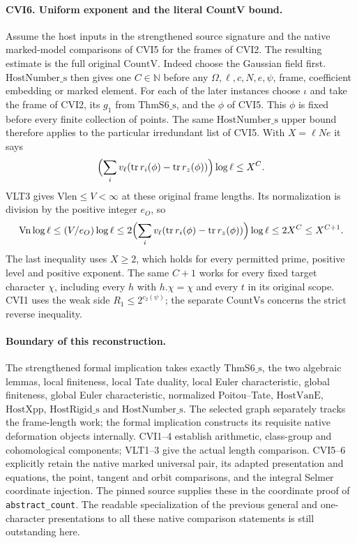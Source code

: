 \paragraph{CVI6. Uniform exponent and the literal CountV bound.}
\label{claim:CVI6}
Assume the host inputs in the strengthened source signature and the
native marked-model comparisons of CVI5 for the frames of CVI2.
The resulting estimate is the full original $\mathrm{CountV}$.
Indeed choose the Gaussian field first. $\mathrm{HostNumber\_s}$
then gives one $C\in\mathbb N$ before any $\Omega,\ell,c,N,e,\psi$,
frame, coefficient embedding or marked element. For each of the
later instances choose $\iota$ and take the frame of CVI2, its
$g_1$ from $\mathrm{ThmS6\_s}$, and the $\phi$ of CVI5. This $\phi$
is fixed before every finite collection of points. The same
$\mathrm{HostNumber\_s}$ upper bound therefore applies to the
particular irredundant list of CVI5. With $X=\ell N e$ it says
\[
 \Bigl(\sum_i v_\ell(\operatorname{tr}r_i(\phi)-
                  \operatorname{tr}r_z(\phi))\Bigr)\log\ell\le X^C .
\]
VLT3 gives $\mathrm{Vlen}\le V<\infty$ at these original
frame lengths. Its normalization is division by the positive
integer $e_O$, so
\[
 \mathrm{Vn}\log\ell\le(V/e_O)\log\ell
 \le 2\Bigl(\sum_i v_\ell(\operatorname{tr}r_i(\phi)-
                         \operatorname{tr}r_z(\phi))\Bigr)\log\ell
 \le 2X^C\le X^{C+1}.
\]
The last inequality uses $X\ge2$, which holds for every permitted
prime, positive level and positive exponent. The same $C+1$ works
for every fixed target character $\chi$, including every $h$ with
$h.\chi=\chi$ and every $t$ in its original scope. CVI1 uses the
weak side $R_1\le2^{c_2(\psi)}$; the separate
$\mathrm{CountVs}$ concerns the strict reverse inequality.

\paragraph{Boundary of this reconstruction.}
The strengthened formal implication takes exactly
$\mathrm{ThmS6\_s}$, the two algebraic lemmas, local finiteness,
local Tate duality, local Euler characteristic, global finiteness,
global Euler characteristic, normalized Poitou--Tate,
$\mathrm{HostVanE}$, $\mathrm{HostXpp}$,
$\mathrm{HostRigid\_s}$ and $\mathrm{HostNumber\_s}$.
The selected graph separately tracks the frame-length work;
the formal implication constructs its requisite native deformation
objects internally. CVI1--4 establish arithmetic, class-group and
cohomological components; VLT1--3 give the actual length comparison.
CVI5--6 explicitly retain the native marked universal pair,
its adapted presentation and equations, the point, tangent and
orbit comparisons, and the integral Selmer coordinate injection.
The pinned source supplies these in the coordinate proof of
\texttt{abstract\_count}. The readable specialization of the
previous general and one-character presentations to all these
native comparison statements is still outstanding here.
